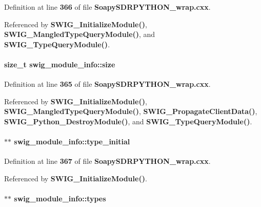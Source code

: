 Definition at line {\bf 366} of file {\bf Soapy\+S\+D\+R\+P\+Y\+T\+H\+O\+N\+\_\+wrap.\+cxx}.



Referenced by {\bf S\+W\+I\+G\+\_\+\+Initialize\+Module()}, {\bf S\+W\+I\+G\+\_\+\+Mangled\+Type\+Query\+Module()}, and {\bf S\+W\+I\+G\+\_\+\+Type\+Query\+Module()}.

\paragraph[{size}]{\setlength{\rightskip}{0pt plus 5cm}size\+\_\+t swig\+\_\+module\+\_\+info\+::size}\label{structswig__module__info_aaf8907cf8509ee0464af8c9dfd909042}


Definition at line {\bf 365} of file {\bf Soapy\+S\+D\+R\+P\+Y\+T\+H\+O\+N\+\_\+wrap.\+cxx}.



Referenced by {\bf S\+W\+I\+G\+\_\+\+Initialize\+Module()}, {\bf S\+W\+I\+G\+\_\+\+Mangled\+Type\+Query\+Module()}, {\bf S\+W\+I\+G\+\_\+\+Propagate\+Client\+Data()}, {\bf S\+W\+I\+G\+\_\+\+Python\+\_\+\+Destroy\+Module()}, and {\bf S\+W\+I\+G\+\_\+\+Type\+Query\+Module()}.

\paragraph[{type\+\_\+initial}]{ $\ast$$\ast$ swig\+\_\+module\+\_\+info\+::type\+\_\+initial}\label{structswig__module__info_aaf36c0bb2e9e796ff1576359d52507c9}


Definition at line {\bf 367} of file {\bf Soapy\+S\+D\+R\+P\+Y\+T\+H\+O\+N\+\_\+wrap.\+cxx}.



Referenced by {\bf S\+W\+I\+G\+\_\+\+Initialize\+Module()}.

\paragraph[{types}]{ $\ast$$\ast$ swig\+\_\+module\+\_\+info\+::types}\label{structswig__module__info_a0a70e9ae189c2a26c92adbf2fabcd549}


